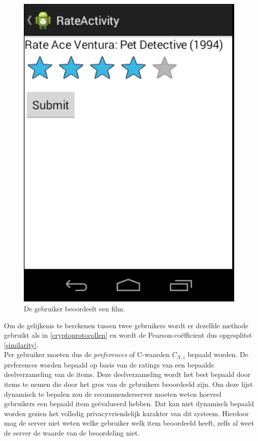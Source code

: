    \begin{figure}[htpb]   
    \label{Figuur::rate_item}      
  \begin{center}    
 \includegraphics[scale=0.5]{fig/rate_item}    
  \end{center}   
  \caption{De gebruiker beoordeelt een film.}  
   \end{figure}
Om de gelijkenis te berekenen tussen twee gebruikers wordt er dezelfde methode gebruikt als in \ref{cryptoprotocollen} en wordt de Pearson-co\"efficient dus opgesplitst \eqref{similarity}.\\ 
Per gebruiker moeten dus de \emph{preferences} of C-waarden $C_{X,i}$ bepaald worden. De preferences worden bepaald op basis van de ratings van een bepaalde deelverzameling van de items. Deze deelverzameling wordt het best bepaald door items te nemen die door het gros van de gebruikers beoordeeld zijn. Om deze lijst dynamisch te bepalen zou de recommenderserver moeten weten hoeveel gebruikers een bepaald item ge\"evalueerd hebben. Dat kan niet dynamisch bepaald worden gezien het volledig privacyvriendelijk karakter van dit systeem. Hierdoor mag de server niet weten welke gebruiker welk item beoordeeld heeft, zelfs al weet de server de waarde van de beoordeling niet.
